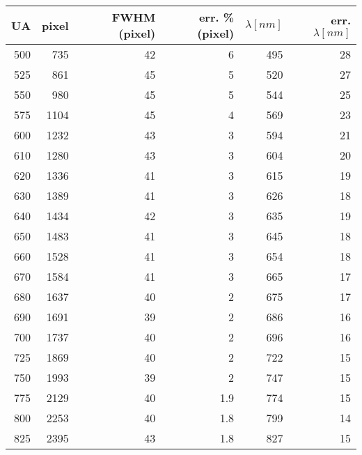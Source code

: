 \begin{tabular}{rrrrrr}
\toprule
UA & pixel & FWHM (pixel) & err. \% (pixel) & $\lambda [nm]$ & err. $\lambda [nm]$ \\
\midrule
500 & 735 & 42 & 6 & 495 & 28 \\
525 & 861 & 45 & 5 & 520 & 27 \\
550 & 980 & 45 & 5 & 544 & 25 \\
575 & 1104 & 45 & 4 & 569 & 23 \\
600 & 1232 & 43 & 3 & 594 & 21 \\
610 & 1280 & 43 & 3 & 604 & 20 \\
620 & 1336 & 41 & 3 & 615 & 19 \\
630 & 1389 & 41 & 3 & 626 & 18 \\
640 & 1434 & 42 & 3 & 635 & 19 \\
650 & 1483 & 41 & 3 & 645 & 18 \\
660 & 1528 & 41 & 3 & 654 & 18 \\
670 & 1584 & 41 & 3 & 665 & 17 \\
680 & 1637 & 40 & 2 & 675 & 17 \\
690 & 1691 & 39 & 2 & 686 & 16 \\
700 & 1737 & 40 & 2 & 696 & 16 \\
725 & 1869 & 40 & 2 & 722 & 15 \\
750 & 1993 & 39 & 2 & 747 & 15 \\
775 & 2129 & 40 & 1.9 & 774 & 15 \\
800 & 2253 & 40 & 1.8 & 799 & 14 \\
825 & 2395 & 43 & 1.8 & 827 & 15 \\
\bottomrule
\end{tabular}
